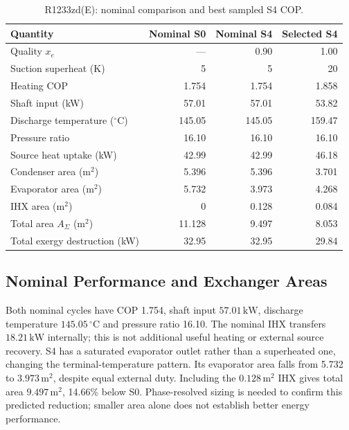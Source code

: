 \documentclass[11pt,a4paper]{article}
\begin{document}
\begin{table}[H]
\centering\small
\caption{R1233zd(E): nominal comparison and best sampled S4 COP.}
\label{tab:nominal}
\begin{tabularx}{\textwidth}{@{}Y r r r@{}}
\toprule
Quantity & Nominal S0 & Nominal S4 & Selected S4\\
\midrule
Quality $x_e$ & --- & 0.90 & 1.00\\
Suction superheat (K) & 5 & 5 & 20\\
Heating COP & 1.754 & 1.754 & 1.858\\
Shaft input (kW) & 57.01 & 57.01 & 53.82\\
Discharge temperature (${}^\circ$C) & 145.05 & 145.05 & 159.47\\
Pressure ratio & 16.10 & 16.10 & 16.10\\
Source heat uptake (kW) & 42.99 & 42.99 & 46.18\\
Condenser area (m$^2$) & 5.396 & 5.396 & 3.701\\
Evaporator area (m$^2$) & 5.732 & 3.973 & 4.268\\
IHX area (m$^2$) & 0 & 0.128 & 0.084\\
Total area $A_\Sigma$ (m$^2$) & 11.128 & 9.497 & 8.053\\
Total exergy destruction (kW) & 32.95 & 32.95 & 29.84\\
\bottomrule
\end{tabularx}
\end{table}

\subsection{Nominal Performance and Exchanger Areas}
Both nominal cycles have COP 1.754, shaft input $57.01\,\mathrm{kW}$,
discharge temperature $145.05\,{}^\circ\mathrm{C}$ and pressure ratio 16.10.
The nominal IHX transfers $18.21\,\mathrm{kW}$ internally; this is not
additional useful heating or external source recovery.
S4 has a saturated evaporator outlet rather than a superheated one, changing
the terminal-temperature pattern. Its evaporator area falls from 5.732 to
$3.973\,\mathrm{m^2}$, despite equal external duty. Including the
$0.128\,\mathrm{m^2}$ IHX gives total area $9.497\,\mathrm{m^2}$,
14.66\% below S0. Phase-resolved sizing is needed to confirm this predicted
reduction; smaller area alone does not establish better energy performance.
\end{document}
